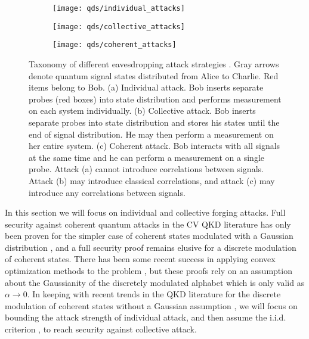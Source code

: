 \begin{figure}[htp]
\centering
	\begin{subfigure}{\linewidth}
		\centering
			\caption{\label{fig:types_of_attack_individual}}
		\texttt{[image: qds/individual\_attacks]}
	\end{subfigure}
	\begin{subfigure}{\linewidth}
		\centering
		\caption{\label{fig:types_of_attack_collective}}	
		\texttt{[image: qds/collective\_attacks]}
	\end{subfigure}
	\begin{subfigure}{\linewidth}
		\centering
		\caption{\label{fig:types_of_attack_coherent}}	
		\texttt{[image: qds/coherent\_attacks]}
	\end{subfigure}
\caption{\label{fig:types_of_attack} Taxonomy of different eavesdropping attack strategies \cite{Lutkenhaus2004}. Gray arrows denote quantum signal states distributed from Alice to Charlie. Red items belong to Bob. (a) Individual attack. Bob inserts separate probes (red boxes) into state distribution and performs measurement on each system individually. (b) Collective attack. Bob inserts separate probes into state distribution and stores his states until the end of signal distribution. He may then perform a measurement on her entire system. (c) Coherent attack. Bob interacts with all signals at the same time and he can perform a measurement on a single probe. Attack (a) cannot introduce correlations between signals. Attack (b) may introduce classical correlations, and attack (c) may introduce any correlations between signals.}
\end{figure}

\MT{--------------------------------------}


In this section we will focus on individual and collective forging attacks. Full security against coherent quantum attacks in the CV QKD literature has only been proven for the simpler case of coherent states modulated with a Gaussian distribution \cite{Lodewyck2007, Leverrier2010c, Pirandola2008, Leverrier2015, Laudenbach2017, Furrer2012}, and a full security proof remains elusive for a discrete modulation of coherent states. There has been some recent success in applying convex optimization methods to the problem \cite{Ghorai2019, Lin2019}, but these proofs rely on an assumption about the Gaussianity of the discretely modulated alphabet \cite{Leverrier2009} which is only valid as $\alpha \rightarrow 0$. In keeping with recent trends in the QKD literature for the discrete modulation of coherent states without a Gaussian assumption \cite{Papanastasiou2018}, we will focus on bounding the attack strength of individual attack, and then assume the i.i.d. criterion \cite{Leverrier2017, Laudenbach2017}, to reach security against collective attack. 

